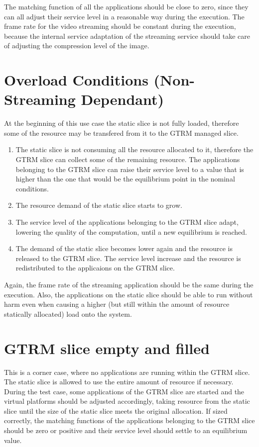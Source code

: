 \documentclass[nobiblatex]{LTHthesis}
\begin{document}
The matching function of all the applications should be close to zero, since
they can all adjust their service level in a reasonable way during the
execution. The frame rate for the video streaming should be constant during
the execution, because the internal service adaptation of the streaming
service should take care of adjusting the compression level of the image.

\section{Overload Conditions (Non-Streaming Dependant)}

At the beginning of this use case the static slice is not fully loaded,
therefore some of the resource may be transfered from it to the GTRM
managed slice.

\begin{enumerate}
\item The static slice is not consuming all the resource allocated to it,
  therefore the GTRM slice can collect some of the remaining resource. The
  applications belonging to the GTRM slice can raise their service level to
  a value that is higher than the one that would be the equilibrium point
  in the nominal conditions.
\item The resource demand of the static slice starts to grow.
\item The service level of the applications belonging to the GTRM slice
  adapt, lowering the quality of the computation, until a new equilibrium
  is reached.
\item The demand of the static slice becomes lower again and the resource
  is released to the GTRM slice. The service level increase and the resource
  is redistributed to the applicaions on the GTRM slice.
\end{enumerate}

Again, the frame rate of the streaming application should be the same
during the execution. Also, the applications on the static slice should be
able to run without harm even when causing a higher (but still within the
amount of resource statically allocated) load onto the system.

\section{GTRM slice empty and filled}

This is a corner case, where no applications are running within the GTRM
slice. The static slice is allowed to use the entire amount of resource if
necessary. During the test case, some applications of the GTRM slice are
started and the virtual platforms should be adjusted accordingly, taking
resource from the static slice until the size of the static slice meets
the original allocation. If sized correctly, the matching functions of the
applications belonging to the GTRM slice should be zero or positive and
their service level should settle to an equilibrium value.
\end{document}
